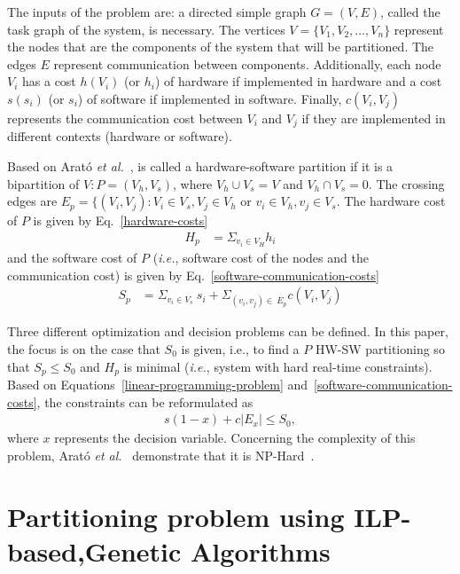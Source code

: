The inputs of the problem are: a directed simple graph $ G = (V,E) $, called the task graph of the system, is necessary. The vertices $V = \{V_1,V_2,\dotso,V_n\}$ represent the nodes that are the components of the system that will be partitioned. The edges $E$ represent communication between components. Additionally, each node  $V_i$ has a cost $h(V_i)$ (or $h_i$) of hardware if implemented in hardware and a cost $s(s_i)$ (or $ s_i $) of software if implemented in software. Finally, $c(V_i,V_j)$ represents the communication cost between $V_i$ and $V_j$ if they are implemented in different contexts (hardware or software).

Based on Arat\'o {\it et al.}~\cite{Arato2003}, is called a hardware-software partition if it is a bipartition of $V:P = (V_h, V_s)$, where $V_h \cup V_s = V$  and $V_h \cap V_s = 0$. The crossing edges are $E_p = \{(V_i,V_j):V_i \in V_s, V_j \in V_h$ or $v_i \in V_h, v_j \in V_s $. The hardware cost of $P$ is given by Eq.~\ref{hardware-costs}
%
\begin{align}
\label{hardware-costs}
H_p  &= \Sigma_{v_i \in V_H} h_i
\end{align}
%
\noindent and the software cost of $P$ ({\it i.e.}, software cost of the nodes and the communication cost) is given by Eq.~\ref{software-communication-costs}
%
\begin{align}
\label{software-communication-costs}
  S_p &= \Sigma_{v_i \in V_s}\:s_i + \Sigma_{(v_i,v_j)\in\:E_p} c(V_i,V_j)
\end{align}

Three different optimization and decision problems can be defined. In this paper, the focus is on the case that $ S_0 $ is given, i.e., to find a $P$ HW-SW partitioning so that $ S_p \leq S_0 $ and $ H_p $ is minimal ({\it i.e.}, system with hard real-time constraints). Based on Equations~\ref{linear-programming-problem} and~\ref{software-communication-costs}, the constraints can be reformulated as 
%
\begin{align}
\label{hw-sw-partitioning}
s\left(1-x\right) + c|E_x| \leq S_0, 
\end{align}
%
\noindent where $x$ represents the decision variable. Concerning the complexity of this problem, Arat\'o {\it et al.}~\cite{Arato2003} demonstrate that it is NP-Hard~\cite{Cormem}.

\section{Partitioning problem using ILP-based,Genetic Algorithms}
\label{ILPGA}

